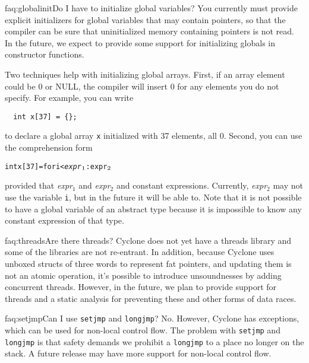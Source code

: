 \begin{faqa}{faq:globalinit}{Do I have to initialize global variables?}
You currently must provide explicit initializers for global variables that
may contain pointers, so that the compiler can be sure that uninitialized
memory containing pointers is not read.  In the future, we expect to provide
some support for initializing globals in constructor functions.  

Two techniques help with initializing global arrays.  First, if an array
element could be 0 or NULL, the compiler will insert 0 for any elements you
do not specify.  For example, you can write
\begin{verbatim}
  int x[37] = {};
\end{verbatim}
to declare a global array \texttt{x} initialized with 37 elements, all 0.
Second, you can use
the comprehension form
\begin{alltt}
  int x[37] = \lb for i < \textit{expr}\(\sb{1}\) : \texttt{expr}\(\sb{2}\) \rb
\end{alltt}
provided that 
\textit{expr}$_1$ and
\textit{expr}$_2$ and
constant expressions.
Currently, \textit{expr}$_2$ may not use the variable \texttt{i}, but
in the future it will be able to.  Note that it is not possible to
have a global variable of an abstract type because it is impossible to
know any constant expression of that type.
\end{faqa}

\begin{faqa}{faq:threads}{Are there threads?}
Cyclone does not yet have a threads library and some of the libraries
are not re-entrant.  In addition, because Cyclone uses unboxed structs
of three words
to represent fat pointers, and updating them is not an atomic operation,
it's possible to introduce unsoundnesses by adding concurrent threads.
However, in the future, we plan to provide support for threads and
a static analysis for preventing these and other forms of data races.
\end{faqa}

\begin{faqa}{faq:setjmp}{Can I use \texttt{setjmp} and \texttt{longjmp}?}
No.  However, Cyclone has exceptions, which can be used for non-local
control flow.  The problem with \texttt{setjmp} and \texttt{longjmp}
is that safety demands we prohibit a \texttt{longjmp} to a place no
longer on the stack.  A future release may have more support for
non-local control flow.
\end{faqa}

